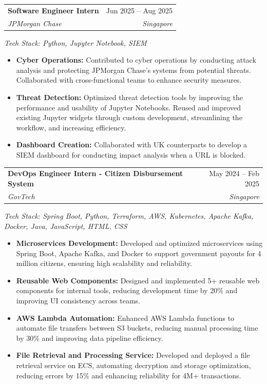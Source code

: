 \documentclass[letter-paper,11pt]{article}
\makeatletter
\newcommand{\resumeItem}[1]{
  \item\small{
    {#1 \vspace{-1pt}}
  }
}
\newcommand{\resumeSubheading}[4]{
  \vspace{-2pt}\item
    \begin{tabular*}{0.97\textwidth}[t]{l@{\extracolsep{\fill}}r}
      \textbf{#1} & #2 \\
      \textit{#3} & \textit{\small #4} \\
    \end{tabular*}\vspace{-7pt}
}
\newcommand{\resumeTechnologies}[1]{
  \item{
    \textit{\small Tech Stack: #1} \vspace{-7pt}
  }
}
\newcommand{\resumeItemListStart}{\begin{itemize}}
\newcommand{\resumeItemListEnd}{\end{itemize}\vspace{-5pt}}
\makeatother
\begin{document}
    \resumeSubheading
    {Software Engineer Intern}{Jun 2025 -- Aug 2025}
    {JPMorgan Chase}{Singapore}
    \resumeTechnologies{Python, Jupyter Notebook, SIEM}
    \resumeItemListStart
        \resumeItem{\textbf{Cyber Operations:} Contributed to cyber operations by conducting attack analysis and protecting JPMorgan Chase’s systems from potential threats. Collaborated with cross-functional teams to enhance security measures.}
        \resumeItem{\textbf{Threat Detection:} Optimized threat detection tools by improving the performance and usability of Jupyter Notebooks. Reused and improved existing Jupyter widgets through custom development, streamlining the workflow, and increasing efficiency.}
        \resumeItem{\textbf{Dashboard Creation:} Collaborated with UK counterparts to develop a SIEM dashboard for conducting impact analysis when a URL is blocked.}
    \resumeItemListEnd
    
     \resumeSubheading
    {DevOps Engineer Intern - Citizen Disbursement System}{May 2024 -- Feb 2025}
    {GovTech}{Singapore}
    \resumeTechnologies{Spring Boot, Python, Terraform, AWS, Kubernetes, Apache Kafka, Docker, Java, JavaScript, HTML, CSS}
    \resumeItemListStart
        \resumeItem{\textbf{Microservices Development:} Developed and optimized microservices using Spring Boot, Apache Kafka, and Docker to support government payouts for 4 million citizens, ensuring high scalability and reliability.}
        \resumeItem{\textbf{Reusable Web Components:} Designed and implemented 5+ reusable web components for internal tools, reducing development time by 20\% and improving UI consistency across teams.}
        \resumeItem{\textbf{AWS Lambda Automation:} Enhanced AWS Lambda functions to automate file transfers between S3 buckets, reducing manual processing time by 30\% and improving data pipeline efficiency.}
        \resumeItem{\textbf{File Retrieval and Processing Service:} Developed and deployed a file retrieval service on ECS, automating decryption and storage optimization, reducing errors by 15\% and enhancing reliability for 4M+ transactions.}
    \resumeItemListEnd
\end{document}
